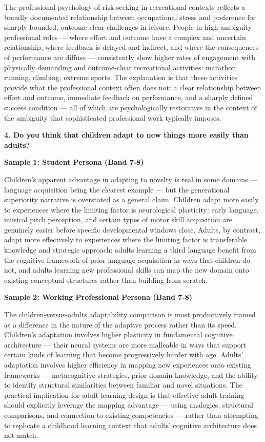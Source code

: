 The professional psychology of risk-seeking in recreational contexts reflects a broadly documented relationship between occupational stress and preference for sharply bounded, outcome-clear challenges in leisure. People in high-ambiguity professional roles — where effort and outcome have a complex and uncertain relationship, where feedback is delayed and indirect, and where the consequences of performance are diffuse — consistently show higher rates of engagement with physically demanding and outcome-clear recreational activities: marathon running, climbing, extreme sports. The explanation is that these activities provide what the professional context often does not: a clear relationship between effort and outcome, immediate feedback on performance, and a sharply defined success condition — all of which are psychologically restorative in the context of the ambiguity that sophisticated professional work typically imposes.

\separator

\begin{ieltsquestion}
\textbf{4. Do you think that children adapt to new things more easily than adults?}
\end{ieltsquestion}
\textbf{Sample 1: Student Persona (Band 7-8)}

Children's apparent advantage in adapting to novelty is real in some domains — language acquisition being the clearest example — but the generational superiority narrative is overstated as a general claim. Children adapt more easily to experiences where the limiting factor is neurological plasticity: early language, musical pitch perception, and certain types of motor skill acquisition are genuinely easier before specific developmental windows close. Adults, by contrast, adapt more effectively to experiences where the limiting factor is transferable knowledge and strategic approach: adults learning a third language benefit from the cognitive framework of prior language acquisition in ways that children do not, and adults learning new professional skills can map the new domain onto existing conceptual structures rather than building from scratch.

\textbf{Sample 2: Working Professional Persona (Band 7-8)}

The children-versus-adults adaptability comparison is most productively framed as a difference in the nature of the adaptive process rather than its speed. Children's adaptation involves higher plasticity in fundamental cognitive architecture — their neural systems are more malleable in ways that support certain kinds of learning that become progressively harder with age. Adults' adaptation involves higher efficiency in mapping new experiences onto existing frameworks — metacognitive strategies, prior domain knowledge, and the ability to identify structural similarities between familiar and novel situations. The practical implication for adult learning design is that effective adult training should explicitly leverage the mapping advantage — using analogies, structural comparisons, and connection to existing competencies — rather than attempting to replicate a childhood learning context that adults' cognitive architecture does not match.

